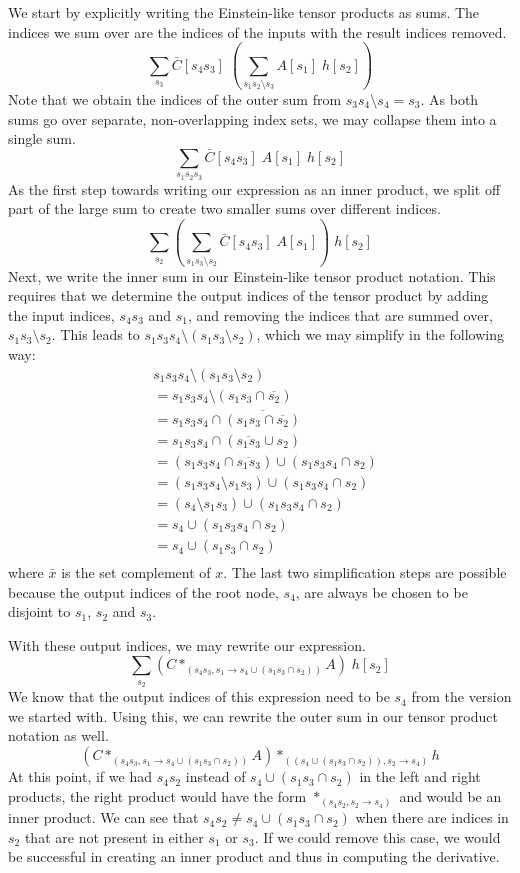 \documentclass[12pt, a4paper]{report}
\begin{document}
We start by explicitly writing the Einstein-like tensor products as sums.
The indices we sum over are the indices of the inputs with the result indices removed.
$$
\sum_{s_3} \bar{C}[s_4 s_3] \; \left( \sum_{s_1 s_2 \setminus s_3} A[s_1] \; h[s_2] \right) 
$$
Note that we obtain the indices of the outer sum from $s_3 s_4 \setminus s_4 = s_3$.
As both sums go over separate, non-overlapping index sets, we may collapse them into a single sum.
$$
\sum_{s_1 s_2 s_3} \bar{C}[s_4 s_3] \; A[s_1] \; h[s_2]
$$
As the first step towards writing our expression as an inner product, we split off part of the large sum to create two smaller sums over different indices.
$$
\sum_{s_2} \left( \sum_{s_1 s_3 \setminus s_2} \bar{C}[s_4 s_3] \; A[s_1] \right) \; h[s_2]
$$
Next, we write the inner sum in our Einstein-like tensor product notation.
This requires that we determine the output indices of the tensor product by adding the input indices, $s_4 s_3$ and $s_1$, and removing the indices that are summed over, $s_1 s_3 \setminus s_2$.
This leads to $s_1 s_3 s_4 \setminus (s_1 s_3 \setminus s_2)$, which we may simplify in the following way:
\begin{align*}
&s_1 s_3 s_4 \setminus (s_1 s_3 \setminus s_2) \\
&= s_1 s_3 s_4 \setminus (s_1 s_3 \cap \overline{s_2}) \\
&= s_1 s_3 s_4 \cap \overline{(s_1 s_3 \cap \overline{s_2})} \\
&= s_1 s_3 s_4 \cap (\overline{s_1 s_3} \cup s_2) \\
&= (s_1 s_3 s_4 \cap \overline{s_1 s_3}) \cup (s_1 s_3 s_4 \cap s_2) \\
&= (s_1 s_3 s_4 \setminus s_1 s_3) \cup (s_1 s_3 s_4 \cap s_2) \\
&= (s_4 \setminus s_1 s_3) \cup (s_1 s_3 s_4 \cap s_2) \\
&= s_4 \cup (s_1 s_3 s_4 \cap s_2) \\
&= s_4 \cup (s_1 s_3 \cap s_2) \\
\end{align*}
where $\bar{x}$ is the set complement of $x$.
The last two simplification steps are possible because the output indices of the root node, $s_4$, are always be chosen to be disjoint to $s_1$, $s_2$ and $s_3$.

With these output indices, we may rewrite our expression.
$$
\sum_{s_2} (C *_{(s_4 s_3, s_1 \rightarrow s_4 \cup (s_1 s_3 \cap s_2))} A) \; h[s_2]
$$
We know that the output indices of this expression need to be $s_4$ from the version we started with.
Using this, we can rewrite the outer sum in our tensor product notation as well.
$$
(C *_{(s_4 s_3, s_1 \rightarrow s_4 \cup (s_1 s_3 \cap s_2))} A) *_{((s_4 \cup (s_1 s_3 \cap s_2)), s_2 \rightarrow s_4)} h
$$
At this point, if we had $s_4 s_2$ instead of $s_4 \cup (s_1 s_3 \cap s_2)$ in the left and right products, the right product would have the form $*_{(s_4 s_2, s_2 \rightarrow s_4)}$ and would be an inner product.
We can see that $s_4 s_2 \neq s_4 \cup (s_1 s_3 \cap s_2)$ when there are indices in $s_2$ that are not present in either $s_1$ or $s_3$.
If we could remove this case, we would be successful in creating an inner product and thus in computing the derivative.
\end{document}
